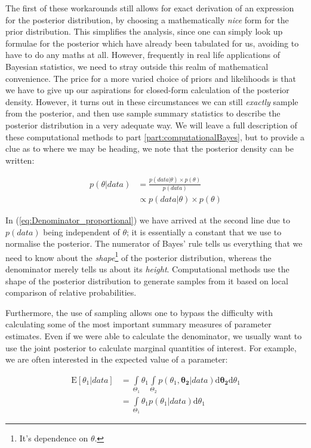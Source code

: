 \documentclass[11pt,fullpage]{book}
\begin{document}
The first of these workarounds still allows for exact derivation of an expression for the posterior distribution, by choosing a mathematically \textit{nice} form for the prior distribution. This simplifies the analysis, since one can simply look up formulae for the posterior which have already been tabulated for us, avoiding to have to do any maths at all. However, frequently in real life applications of Bayesian statistics, we need to stray outside this realm of mathematical convenience. The price for a more varied choice of priors and likelihoods is that we have to give up our aspirations for closed-form calculation of the posterior density. However, it turns out in these circumstances we can still \textit{exactly} sample from the posterior, and then use sample summary statistics to describe the posterior distribution in a very adequate way. We will leave a full description of these computational methods to part \ref{part:computationalBayes}, but to provide a clue as to where we may be heading, we note that the posterior density can be written:

\begin{align}\label{eq:Denominator_proportional}
p(\theta|data) &= \frac{p(data|\theta)\times p(\theta)}{p(data)}\\
&\propto p(data|\theta)\times p(\theta)
\end{align}

In (\ref{eq:Denominator_proportional}) we have arrived at the second line due to $p(data)$ being independent of $\theta$; it is essentially a constant that we use to normalise the posterior. The numerator of Bayes' rule tells us everything that we need to know about the \textit{shape}\footnote{It's dependence on $\theta$.} of the posterior distribution, whereas the denominator merely tells us about its \textit{height}. Computational methods use the shape of the posterior distribution to generate samples from it based on local comparison of relative probabilities. 

Furthermore, the use of sampling allows one to bypass the difficulty with calculating some of the most important summary measures of parameter estimates. Even if we were able to calculate the denominator, we usually want to use the joint posterior to calculate marginal quantities of interest. For example, we are often interested in the expected value of a parameter:

\begin{align}
\mathrm{E}[\theta_1|data] &= \int\limits_{\Theta_1} \theta_1\int\limits_{\Theta_2} p(\theta_1,\boldsymbol{\theta_2}|data)\mathrm{d}\boldsymbol{\theta_2} \mathrm{d}\theta_1\\
&= \int\limits_{\Theta_1} \theta_1 p(\theta_1|data) \mathrm{d}\theta_1
\end{align}
\end{document}
